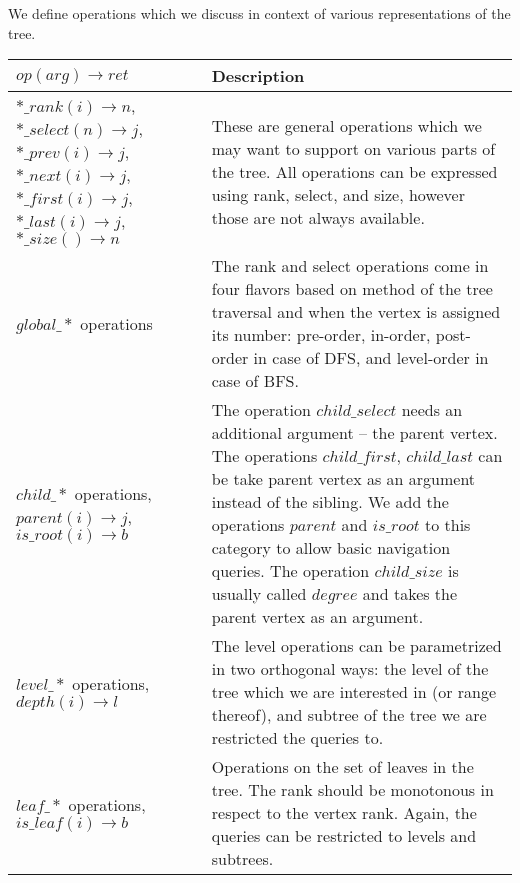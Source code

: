 We define operations which we discuss in context of various representations of the tree.

\noindent\begin{tabularx}{\textwidth}{|L{0.7}|L{1.3}|}
	\hline
	$op(arg) \rightarrow ret$
	& Description \\ \hline \hline
	
	$*\_rank(i) \rightarrow n$, \newline
	$*\_select(n) \rightarrow j$, \newline
	$*\_prev(i) \rightarrow j$, \newline
	$*\_next(i) \rightarrow j$, \newline
	$*\_first(i) \rightarrow j$, \newline
	$*\_last(i) \rightarrow j$, \newline
	$*\_size() \rightarrow n$
	& These are general operations which we may want to support on various parts of the tree.
	All operations can be expressed using rank, select, and size, however those are not always available. \\ \hline \hline
	
	$global\_*$ operations
	& The rank and select operations come in four flavors based on method of the tree traversal and when the vertex is assigned its number:
	pre-order, in-order, post-order in case of DFS, and level-order in case of BFS. \\ \hline
	
	$child\_*$ operations, \newline
	$parent(i) \rightarrow j$, \newline
	$is\_root(i) \rightarrow b$
	& The operation $child\_select$ needs an additional argument -- the parent vertex.
	The operations $child\_first$, $child\_last$ can be take parent vertex as an argument instead of the sibling.
	We add the operations $parent$ and $is\_root$ to this category to allow basic navigation queries.
	The operation $child\_size$ is usually called $degree$ and takes the parent vertex as an argument.\\ \hline

	$level\_*$ operations, \newline
	$depth(i) \rightarrow l$
	& The level operations can be parametrized in two orthogonal ways:
	the level of the tree which we are interested in (or range thereof), and subtree of the tree we are restricted the queries to. \\ \hline
	
	$leaf\_*$ operations, \newline
	$is\_leaf(i) \rightarrow b$
	& Operations on the set of leaves in the tree.
	The rank should be monotonous in respect to the vertex rank. 
	Again, the queries can be restricted to levels and subtrees.\\ \hline \hline
	

\end{tabularx}
